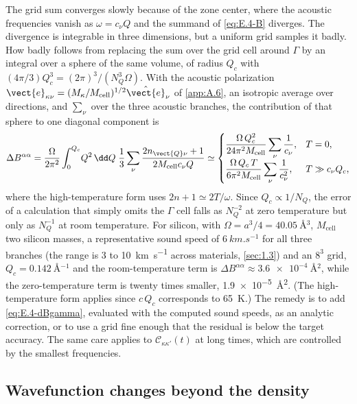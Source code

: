 The grid sum converges slowly because of the zone center, where the acoustic frequencies vanish as $\omega = c_\nu Q$ and the summand of \cref{eq:E.4-B} diverges. The divergence is integrable in three dimensions, but a uniform grid samples it badly. How badly follows from replacing the sum over the grid cell around $\Gamma$ by an integral over a sphere of the same volume, of radius $Q_c$ with $(4\pi/3)Q_c^3 = (2\pi)^3/(N_Q^3\Omega)$. With the acoustic polarization $\vect{e}_{\kappa\nu} = (M_\kappa/M_{\mathrm{cell}})^{1/2}\hat{\vect{e}}_\nu$ of \cref{app:A.6}, an isotropic average over directions, and $\sum_\nu$ over the three acoustic branches, the contribution of that sphere to one diagonal component is
\begin{equation}
  \Delta B^{\alpha\alpha} = \frac{\Omega}{2\pi^2}\int_0^{Q_c}\!Q^2\,\dd Q\;\frac13\sum_\nu\frac{2n_{\vect{Q}\nu}+1}{2M_{\mathrm{cell}}c_\nu Q}
  \simeq
  \begin{cases}
    \dfrac{\Omega\,Q_c^2}{24\pi^2M_{\mathrm{cell}}}\displaystyle\sum_\nu\frac{1}{c_\nu}, & T = 0,\\[2ex]
    \dfrac{\Omega\,Q_c\,T}{6\pi^2M_{\mathrm{cell}}}\displaystyle\sum_\nu\frac{1}{c_\nu^2}, & T \gg c_\nu Q_c,
  \end{cases}
  \label{eq:E.4-dBgamma}
\end{equation}
where the high-temperature form uses $2n + 1 \simeq 2T/\omega$. Since $Q_c \propto 1/N_Q$, the error of a calculation that simply omits the $\Gamma$ cell falls as $N_Q^{-2}$ at zero temperature but only as $N_Q^{-1}$ at room temperature. For silicon, with $\Omega = a^3/4 = \SI{40.05}{\angstrom^3}$, $M_{\mathrm{cell}}$ two silicon masses, a representative sound speed of $\SI{6}{km.s^{-1}}$ for all three branches (the range is 3 to \SI{10}{km.s^{-1}} across materials, \cref{sec:1.3}) and an $8^3$ grid, $Q_c = \SI{0.142}{\angstrom^{-1}}$ and the room-temperature term is $\Delta B^{\alpha\alpha} \approx \SI{3.6e-4}{\angstrom^2}$, while the zero-temperature term is twenty times smaller, \SI{1.9e-5}{\angstrom^2}. (The high-temperature form applies since $c\,Q_c$ corresponds to \SI{65}{K}.) The remedy is to add \cref{eq:E.4-dBgamma}, evaluated with the computed sound speeds, as an analytic correction, or to use a grid fine enough that the residual is below the target accuracy. The same care applies to $\mathcal{C}_{\kappa\kappa'}(t)$ at long times, which are controlled by the smallest frequencies.

\subsection{Wavefunction changes beyond the density}

